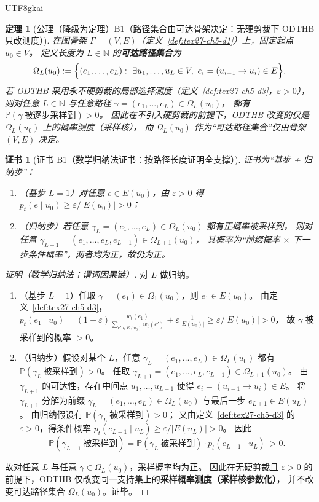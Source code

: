 \documentclass[12pt]{article}
\newtheorem{theorem}{定理}[section]
\newtheorem{Certificate}{证书}[section]
\newcommand{\NN}{\mathbb{N}}
\begin{document}
\begin{CJK*}{UTF8}{gkai}
\begin{theorem}[公理（降级为定理）B1（路径集合由可达骨架决定：无硬剪裁下 ODTHB 只改测度）]
\label{thm:tex27-ch5-odthb-support}
在图骨架 $\Gamma=(V,E)$（定义~\ref{def:tex27-ch5-d1}）上，固定起点 $u_0\in V$。
定义长度为 $L\in\NN$ 的\textbf{可达路径集合}为
\[
  \Omega_L(u_0):=\Bigl\{(e_1,\dots,e_L):\ \exists u_1,\dots,u_L\in V,\ e_i=(u_{i-1}\to u_i)\in E\Bigr\}.
\]
若 ODTHB 采用永不硬剪裁的局部选择测度（定义~\ref{def:tex27-ch5-d3}，$\varepsilon>0$），
则对任意 $L\in\NN$ 与任意路径 $\gamma=(e_1,\dots,e_L)\in\Omega_L(u_0)$，
都有 $\mathbb{P}(\gamma\ \text{被逐步采样到})>0$。
因此在不引入硬剪裁的前提下，ODTHB 改变的仅是 $\Omega_L(u_0)$ 上的概率测度（采样核），
而 $\Omega_L(u_0)$ 作为“可达路径集合”仅由骨架 $(V,E)$ 决定。
\end{theorem}

\begin{Certificate}[证书 B1（数学归纳法证书：按路径长度证明全支撑）]
\label{cert:tex27-ch5-odthb-support}
证书为“基步 + 归纳步”：
\begin{enumerate}
  \item（基步 $L=1$）对任意 $e\in E(u_0)$，由 $\varepsilon>0$ 得 $p_t(e\mid u_0)\ge \varepsilon/|E(u_0)|>0$；
  \item（归纳步）若任意 $\gamma_L=(e_1,\dots,e_L)\in\Omega_L(u_0)$ 都有正概率被采样到，
  则对任意 $\gamma_{L+1}=(e_1,\dots,e_L,e_{L+1})\in\Omega_{L+1}(u_0)$，
  其概率为“前缀概率 $\times$ 下一步条件概率”，两者均为正，故仍为正。
\end{enumerate}
\end{Certificate}

\begin{proof}[证明（数学归纳法；谓词因果链）]
对 $L$ 做归纳。
\begin{enumerate}
  \item（基步 $L=1$）任取 $\gamma=(e_1)\in\Omega_1(u_0)$，则 $e_1\in E(u_0)$。
  由定义~\ref{def:tex27-ch5-d3}，$p_t(e_1\mid u_0)=(1-\varepsilon)\frac{w_t(e_1)}{\sum_{e'\in E(u_0)}w_t(e')}
    +\varepsilon\frac{1}{|E(u_0)|}\ge \varepsilon/|E(u_0)|>0$，
  故 $\gamma$ 被采样到的概率 $>0$。
  \item（归纳步）假设对某个 $L$，任意 $\gamma_L=(e_1,\dots,e_L)\in\Omega_L(u_0)$ 都有 $\mathbb{P}(\gamma_L\ \text{被采样到})>0$。
  任取 $\gamma_{L+1}=(e_1,\dots,e_L,e_{L+1})\in\Omega_{L+1}(u_0)$。
  由 $\gamma_{L+1}$ 的可达性，存在中间点 $u_1,\dots,u_{L+1}$ 使得 $e_i=(u_{i-1}\to u_i)\in E$。
  将 $\gamma_{L+1}$ 分解为前缀 $\gamma_L=(e_1,\dots,e_L)\in\Omega_L(u_0)$ 与最后一步 $e_{L+1}\in E(u_L)$。
  由归纳假设有 $\mathbb{P}(\gamma_L\ \text{被采样到})>0$；
  又由定义~\ref{def:tex27-ch5-d3} 的 $\varepsilon>0$，得条件概率 $p_t(e_{L+1}\mid u_L)\ge \varepsilon/|E(u_L)|>0$。
因此
\[
    \mathbb{P}(\gamma_{L+1}\ \text{被采样到})
    =\mathbb{P}(\gamma_L\ \text{被采样到})\cdot p_t(e_{L+1}\mid u_L)\ >0.
  \]
\end{enumerate}
故对任意 $L$ 与任意 $\gamma\in\Omega_L(u_0)$，采样概率均为正。
因此在无硬剪裁且 $\varepsilon>0$ 的前提下，ODTHB 仅改变同一支持集上的\textbf{采样概率测度（采样核参数化）}，
并不改变可达路径集合 $\Omega_L(u_0)$。证毕。
\end{proof}


\end{CJK*}
\end{document}
